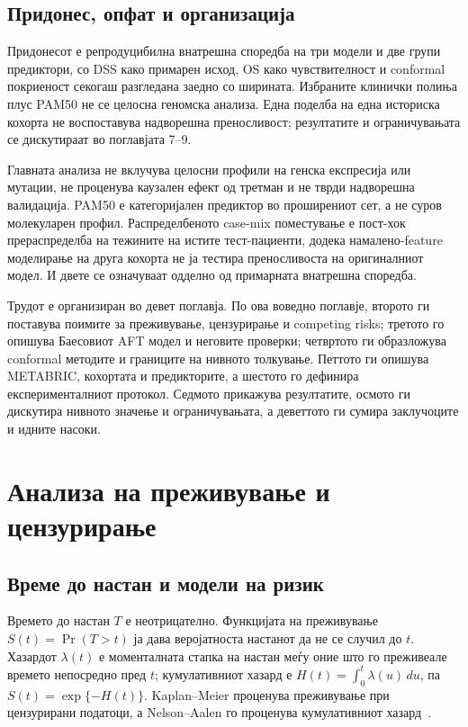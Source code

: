 \documentclass[12pt]{article}
\begin{document}
\subsection{Придонес, опфат и организација}

Придонесот е репродуцибилна внатрешна споредба на три модели и две групи предиктори, со DSS како примарен исход, OS како чувствителност и conformal покриеност секогаш разгледана заедно со ширината. Избраните клинички полиња плус PAM50 не се целосна геномска анализа. Една поделба на една историска кохорта не воспоставува надворешна преносливост; резултатите и ограничувањата се дискутираат во поглавјата 7–9.

Главната анализа не вклучува целосни профили на генска експресија или мутации, не проценува каузален ефект од третман и не тврди надворешна валидација. PAM50 е категоријален предиктор во проширениот сет, а не суров молекуларен профил. Распределбеното case-mix поместување е пост-хок прераспределба на тежините на истите тест-пациенти, додека намалено-feature моделирање на друга кохорта не ја тестира преносливоста на оригиналниот модел. И двете се означуваат одделно од примарната внатрешна споредба.

Трудот е организиран во девет поглавја. По ова воведно поглавје, второто ги поставува поимите за преживување, цензурирање и competing risks; третото го опишува Баесовиот AFT модел и неговите проверки; четвртото ги образложува conformal методите и границите на нивното толкување. Петтото ги опишува METABRIC, кохортата и предикторите, а шестото го дефинира експерименталниот протокол. Седмото прикажува резултатите, осмото ги дискутира нивното значење и ограничувањата, а деветтото ги сумира заклучоците и идните насоки.

\section{Анализа на преживување и цензурирање}

\subsection{Време до настан и модели на ризик}

Времето до настан $T$ е неотрицателно. Функцијата на преживување
$S(t)=\Pr(T>t)$ ја дава веројатноста настанот да не се случил до $t$.
Хазардот $\lambda(t)$ е моменталната стапка на настан меѓу оние што го
преживеале времето непосредно пред $t$; кумулативниот хазард е
$H(t)=\int_0^t\lambda(u)\,du$, па $S(t)=\exp\{-H(t)\}$. Kaplan--Meier
проценува преживување при цензурирани податоци, а Nelson--Aalen го проценува
кумулативниот хазард~\cite{kaplan1958,nelson1972}.
\end{document}
